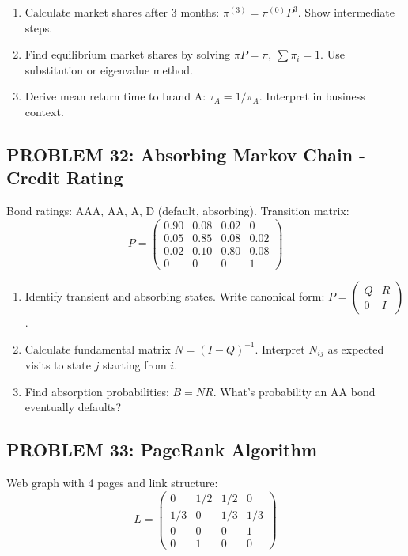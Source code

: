 \documentclass[12pt]{article}
\begin{document}
\begin{enumerate}
\item[(a)] Calculate market shares after 3 months: \(\pi^{(3)} = \pi^{(0)}P^3\). Show intermediate steps.
\item[(b)] Find equilibrium market shares by solving \(\pi P = \pi\), \(\sum \pi_i = 1\). Use substitution or eigenvalue method.
\item[(c)] Derive mean return time to brand A: \(\tau_A = 1/\pi_A\). Interpret in business context.
\end{enumerate}

\subsection*{PROBLEM 32: Absorbing Markov Chain - Credit Rating}

Bond ratings: AAA, AA, A, D (default, absorbing). Transition matrix:
\[
P = \begin{pmatrix}
0.90 & 0.08 & 0.02 & 0 \\
0.05 & 0.85 & 0.08 & 0.02 \\
0.02 & 0.10 & 0.80 & 0.08 \\
0 & 0 & 0 & 1
\end{pmatrix}
\]

\begin{enumerate}
\item[(a)] Identify transient and absorbing states. Write canonical form: \(P = \begin{pmatrix} Q & R \\ 0 & I \end{pmatrix}\).
\item[(b)] Calculate fundamental matrix \(N = (I - Q)^{-1}\). Interpret \(N_{ij}\) as expected visits to state \(j\) starting from \(i\).
\item[(c)] Find absorption probabilities: \(B = NR\). What's probability an AA bond eventually defaults?
\end{enumerate}

\subsection*{PROBLEM 33: PageRank Algorithm}

Web graph with 4 pages and link structure:
\[
L = \begin{pmatrix}
0 & 1/2 & 1/2 & 0 \\
1/3 & 0 & 1/3 & 1/3 \\
0 & 0 & 0 & 1 \\
0 & 1 & 0 & 0
\end{pmatrix}
\]
\end{document}
